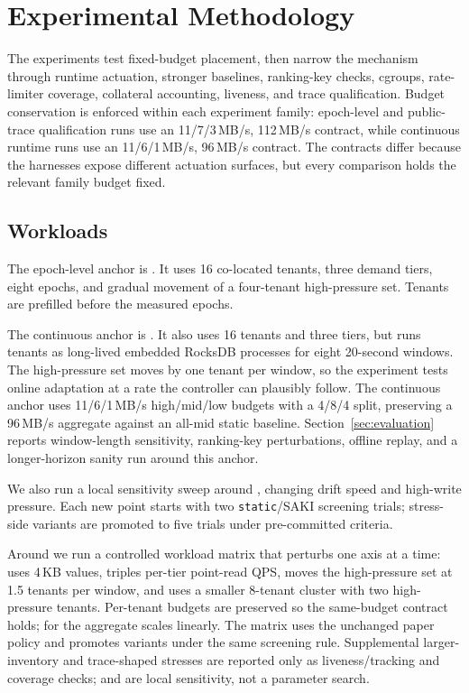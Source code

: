 \section{Experimental Methodology}

The experiments test fixed-budget placement, then narrow the mechanism through
runtime actuation, stronger baselines, ranking-key checks, cgroups, rate-limiter
coverage, collateral accounting, liveness, and trace qualification. Budget
conservation is enforced within each experiment family: epoch-level and
public-trace qualification runs use an 11/7/3\,MB/s, 112\,MB/s contract, while
continuous runtime runs use an 11/6/1\,MB/s, 96\,MB/s contract. The contracts
differ because the harnesses expose different actuation surfaces, but every
comparison holds the relevant family budget fixed.

\subsection{Workloads}

The epoch-level anchor is \epochdrift. It uses 16 co-located tenants, three
demand tiers, eight epochs, and gradual movement of a four-tenant
high-pressure set. Tenants are prefilled before the measured epochs.

The continuous anchor is \runtimedrift. It also uses 16 tenants and three
tiers, but runs tenants as long-lived embedded RocksDB processes for eight
20-second windows. The high-pressure set moves by one tenant per window, so the
experiment tests online adaptation at a rate the controller can plausibly
follow. The continuous anchor uses 11/6/1\,MB/s high/mid/low budgets with a
4/8/4 split, preserving a 96\,MB/s aggregate against an all-mid static
baseline. Section~\ref{sec:evaluation} reports window-length sensitivity,
ranking-key perturbations, offline replay, and a longer-horizon sanity run
around this anchor.

We also run a local sensitivity sweep around \epochdrift, changing drift speed
and high-write pressure. Each new point starts with two \texttt{static}/SAKI
screening trials; stress-side variants are promoted to five trials under
pre-committed criteria.

Around \runtimedrift we run a controlled workload matrix that perturbs one
axis at a time:  uses 4\,KB values, \readthreex triples per-tier
point-read QPS, \fastdrift moves the high-pressure set at 1.5 tenants per
window, and \tenantseight uses a smaller 8-tenant cluster with two
high-pressure tenants. Per-tenant budgets are preserved so the same-budget
contract holds; for \tenantseight the aggregate scales linearly. The matrix
uses the unchanged paper policy and promotes variants under the same screening
rule. Supplemental larger-inventory and trace-shaped stresses are reported only
as liveness/tracking and coverage checks; \fastdrift and \tenantseight are
local sensitivity, not a parameter search.

